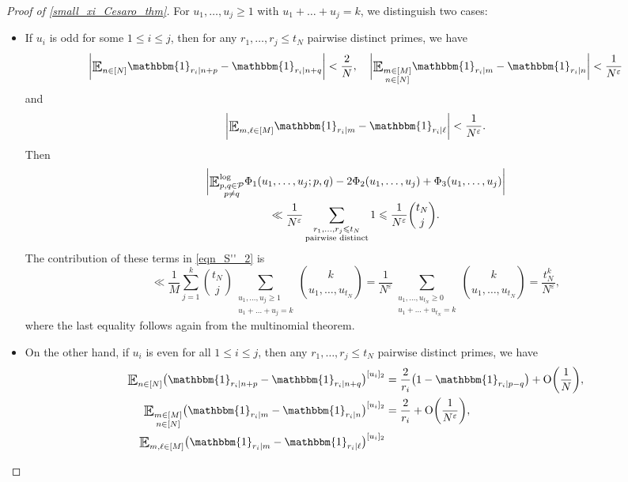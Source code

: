\documentclass[letter,11pt]{article}
\theoremstyle{plain} %
\theoremstyle{definition} %
\theoremstyle{plain}
\theoremstyle{plain}
\theoremstyle{plain}
\numberwithin{equation}{section}
\newcommand{\Oh}{{\mathrm O}}
\renewcommand{\epsilon}{\varepsilon}
\renewcommand{\leq}{\leqslant}
\renewcommand{\geq}{\geqslant}
\newcommand{\E}{\raisebox{-0.4ex}{\scalebox{1.4}[1.3]{$\mathbb{E}$}}}
\newcommand{\Esub}[1]{\raisebox{-0.4ex}{\scalebox{1.4}[1.3]{$\mathbb{E}$}}\raisebox{-0.35ex}{\ensuremath{_{\scriptstyle #1}}}}
\newcommand{\logE}{{\E}^{\log}}
\newcommand{\1}{\mathbbm{1}}
\newcommand{\Pc}{\mathcal{P}}
\begin{document}
\begin{proof}[Proof of \cref{small_xi_Cesaro_thm}]
For $u_1,\ldots,u_j\geq 1$ with $u_1+\ldots+u_j = k$,
we distinguish two cases:
\begin{itemize}
    \item If $u_i$ is odd for some $1\leq i\leq j$, then for any $r_1,\ldots,r_j\leq t_N$ pairwise distinct primes, we have
    $$\bigg|\Esub{n\in[N]}\1_{r_i\mid n+p}-\1_{r_i\mid n+q}\bigg| < \frac{2}{N}, \quad
    \bigg|\Esub{\substack{m\in[M] \\ n\in[N]}}\1_{r_i\mid m}-\1_{r_i\mid n}\bigg|<\frac{1}{N^\epsilon}$$
    and 
    $$\bigg|\Esub{m,\ell\in[M]}\1_{r_i\mid m}-\1_{r_i\mid \ell}\bigg|<\frac{1}{N^\epsilon}.$$
    Then
    \begin{multline}\label{Phi_bound1}
        \bigg|\logE_{\substack{p,q\in\Pc \\ p\neq q}}\Phi_1(u_1,\ldots,u_j;p,q)-2\Phi_2(u_1,\ldots,u_j)+\Phi_3(u_1,\ldots,u_j)\bigg| \\
        \ll \frac{1}{N^\epsilon}\sum_{\substack{r_1,\ldots,r_j\leq t_N \\ \text{pairwise distinct}}}1
        \leq \frac{1}{N^\epsilon}\binom{t_N}{j}. 
    \end{multline}
    The contribution of these terms in \eqref{eqn_S''_2} is 
    \begin{equation}\label{eqn_1contr_S''}
        \ll \frac{1}{M}\sum_{j=1}^k \binom{t_N}{j} \sum_{\substack{u_1,\ldots,u_j\geq 1 \\ u_1+\ldots+u_j=k}} \binom{k}{u_1,\ldots,u_{t_N}} 
        = \frac{1}{N^\epsilon} \sum_{\substack{u_1,\ldots,u_{t_N}\geq 0 \\ u_1+\ldots +u_{t_N}=k}}\binom{k}{u_1,\ldots,u_{t_N}} 
        = \frac{t_N^k}{N^\epsilon},
    \end{equation}
where the last equality follows again from the multinomial theorem.
\item On the other hand, if $u_i$ is even for all $1\leq i\leq j$, then any $r_1,\ldots,r_j\leq t_N$ pairwise distinct primes, we have
    \begin{align*}
        \Esub{n\in[N]}\big(\1_{r_i\mid n+p}-\1_{r_i\mid n+q}\big)^{[u_i]_2}
        & = \frac{2}{r_i}\big(1-\1_{r_i\mid p-q}\big)+\Oh\bigg(\frac{1}{N}\bigg), \\
        \Esub{\substack{m\in[M] \\ n\in[N]}}\big(\1_{r_i\mid m} - \1_{r_i\mid n}\big)^{[u_i]_2} 
        & = \frac{2}{r_i} + \Oh\bigg(\frac{1}{N^\epsilon}\bigg), \\
        \Esub{m,\ell\in[M]}\big(\1_{r_i\mid m}-\1_{r_i\mid \ell}\big)^{[u_i]_2}

\end{align*}
\end{itemize}
\end{proof}
\end{document}

